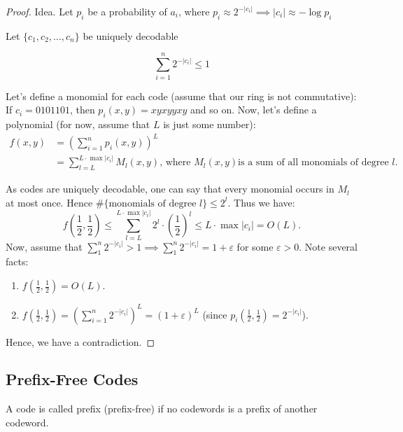 \begin{proof}
    Idea.
    Let $p_{i}$ be a probability of $a_{i}$, where $p_{i} \approx 2^{-|c_{i}|} \implies |c_{i}| \approx - \log p_{i}$

    Let $\{ c_{1}, c_{2}, \dots, c_{n} \}$ be uniquely decodable

    \[
        \sum _{ i = 1 }^{ n } 2^{-|c_{i}|} \le 1
    \]

    Let's define a monomial for each code (assume that our ring is not commutative):
    If $c_{i} = 0101101$, then $p_{i}(x, y) = xyxyyxy$ and so on.
    Now, let's define a polynomial (for now, assume that $L$ is just some number):
    \begin{align*}
        f(x, y) &= \left( \sum _{ i = 1 }^{ n }  p_{i}(x, y) \right)^{L}  \\
        &= \sum _{ l = L }^{ L \cdot \max |c_{i}| } M_{l}(x, y)\text{, where } M_{l}(x, y) \text{is a sum of all monomials of degree } l.
    \end{align*}

    As codes are uniquely decodable, one can say that every monomial occurs in $M_{l}$ at most once.
    Hence $\# \{ \text{monomials of degree } l \} \le 2^{l}$.
    Thus we have:
    \[
        f\left( \frac{1}{2}, \frac{1}{2} \right) \leq \sum _{ l = L }^{ L \cdot \max |c_{i}| } 2^{l} \cdot \left( \frac{1}{2} \right)^{l} \le L \cdot \max |c_{i}| = O(L).
    \]
    Now, assume that $\sum_1^n 2^{-|c_{i}|} > 1 \implies \sum_1^n {2}^{-|c_{i}|}  = 1 + \varepsilon$ for some $\varepsilon > 0$.
    Note several facts:
    \begin{enumerate}
        \item $f\left( \frac{1}{2}, \frac{1}{2} \right) = O(L)$.
        \item $f\left( \frac{1}{2}, \frac{1}{2} \right) = \left( \sum_{i = 1}^n 2^{-|c_{i}|} \right)^{L} = (1 + \varepsilon)^{L}$ (since $p_{i}\left( \frac{1}{2}, \frac{1}{2} \right) = 2^{-|c_{i}|}$).
    \end{enumerate}
    Hence, we have a contradiction.
\end{proof}

\subsection{Prefix-Free Codes}

\begin{definition}
    A code is called prefix (prefix-free) if no codewords is a prefix of another codeword.
\end{definition}


